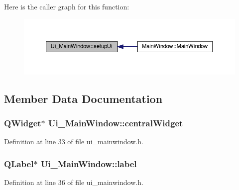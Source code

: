 Here is the caller graph for this function\+:
\nopagebreak
\begin{figure}[H]
\begin{center}
\leavevmode
\includegraphics[width=350pt]{class_ui___main_window_acf4a0872c4c77d8f43a2ec66ed849b58_icgraph}
\end{center}
\end{figure}




\subsection{Member Data Documentation}
\subsubsection[{\texorpdfstring{central\+Widget}{centralWidget}}]{\setlength{\rightskip}{0pt plus 5cm}Q\+Widget$\ast$ Ui\+\_\+\+Main\+Window\+::central\+Widget}\hypertarget{class_ui___main_window_a30075506c2116c3ed4ff25e07ae75f81}{}\label{class_ui___main_window_a30075506c2116c3ed4ff25e07ae75f81}


Definition at line 33 of file ui\+\_\+mainwindow.\+h.

\subsubsection[{\texorpdfstring{label}{label}}]{\setlength{\rightskip}{0pt plus 5cm}Q\+Label$\ast$ Ui\+\_\+\+Main\+Window\+::label}\hypertarget{class_ui___main_window_ad9c89133780f28e6efa2ec17ceb9cff5}{}\label{class_ui___main_window_ad9c89133780f28e6efa2ec17ceb9cff5}


Definition at line 36 of file ui\+\_\+mainwindow.\+h.

